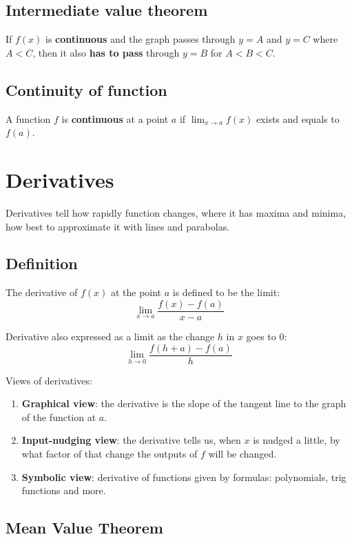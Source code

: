 \documentclass[12pt, a4paper]{scrartcl}
\begin{document}
\subsection{Intermediate value theorem}
\label{sec:limits:ivt}
If $f(x)$ is \textbf{continuous} and the graph passes through $y = A$ and $y = C$ where $A < C$, then it also \textbf{has to pass} through $y = B$ for $A < B < C$.

\subsection{Continuity of function}
\label{sec:limits:continuity}
A function $f$ is \textbf{continuous} at a point $a$ if $\lim_{x \to a}f(x)$ exists and equals to $f(a)$.

\section{Derivatives}
\label{sec:derivatives}
Derivatives tell how rapidly function changes, where it has maxima and minima, how best to approximate it with lines and parabolas.

\subsection{Definition}
\label{sec:derivatives:def}
The derivative of $f(x)$ at the point $a$ is defined to be the limit: $$\lim_{x \to a}\dfrac{f(x) - f(a)}{x - a}$$

Derivative also expressed as a limit as the change $h$ in $x$ goes to $0$: $$\lim_{h \to 0}\dfrac{f(h+a) - f(a)}{h}$$

Views of derivatives:
\begin{enumerate}
    \item \textbf{Graphical view}: the derivative is the slope of the tangent line to the graph of the function at $a$.
    \item \textbf{Input-nudging view}: the derivative tells us, when $x$ is nudged a little, by what factor of that change the outputs of $f$ will be changed.
    \item \textbf{Symbolic view}: derivative of functions given by formulas: polynomials, trig functions and more.
\end{enumerate}


\subsection{Mean Value Theorem}
\label{sec:derivatives:mvt}
\end{document}
